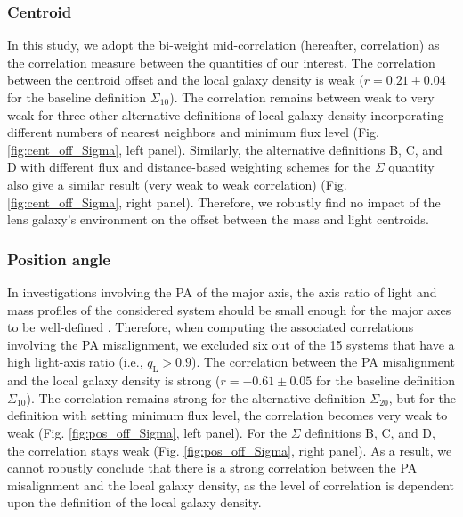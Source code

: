 \documentclass{aa}
\begin{document}
\subsubsection{Centroid}
In this study, we adopt the bi-weight mid-correlation (hereafter, correlation) as the correlation measure between the quantities of our interest.
The correlation between the centroid offset and the local galaxy density is weak ($r=0.21 \pm 0.04$ for the baseline definition $\Sigma_{10}$). The correlation remains between weak to very weak for three other alternative definitions of local galaxy density incorporating different numbers of nearest neighbors and minimum flux level (Fig. \ref{fig:cent_off_Sigma}, left panel). Similarly, the alternative definitions B, C, and D with different flux and distance-based weighting schemes for the $\Sigma$ quantity also give a similar result (very weak to weak correlation) (Fig. \ref{fig:cent_off_Sigma}, right panel). Therefore, we robustly find no impact of the lens galaxy's environment on the offset between the mass and light centroids.

\subsubsection{Position angle} \label{sec:pa_correlations}

In investigations involving the PA of the major axis, the axis ratio of light and mass profiles of the considered system should be small enough for the major axes to be well-defined \citep{Treu09}. Therefore, when computing the associated correlations involving the PA misalignment, we excluded six out of the 15 systems that have a high light-axis ratio (i.e., $q_\text{L}>0.9$). The correlation between the PA misalignment and the local galaxy density is strong ($r= -0.61 \pm 0.05$ for the baseline definition $\Sigma_{10}$). The correlation remains strong for the alternative definition $\Sigma_{20}$, but for the definition with setting minimum flux level, the correlation becomes very weak to weak (Fig. \ref{fig:pos_off_Sigma}, left panel). For the $\Sigma$ definitions B, C, and D, the correlation stays weak (Fig. \ref{fig:pos_off_Sigma}, right panel). As a result, we cannot robustly conclude that there is a strong correlation between the PA misalignment and the local galaxy density, as the level of correlation is dependent upon the definition of the local galaxy density.
\end{document}
